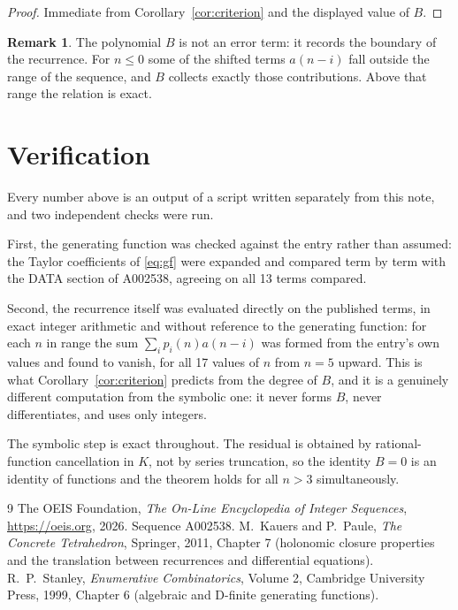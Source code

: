 \documentclass[11pt,a4paper]{article}
\theoremstyle{plain}
\theoremstyle{definition}
\newtheorem{remark}[theorem]{Remark}
\begin{document}
\begin{proof}
Immediate from Corollary~\ref{cor:criterion} and the displayed value of $B$.
\end{proof}

\begin{remark}
The polynomial $B$ is not an error term: it records the boundary of the recurrence. For
$n\le0$ some of the shifted terms $a(n-i)$ fall outside the range of the sequence,
and $B$ collects exactly those contributions. Above that range the relation is exact.
\end{remark}

\section{Verification}

Every number above is an output of a script written separately from this note, and two
independent checks were run.

First, the generating function was checked against the entry rather than assumed: the
Taylor coefficients of \eqref{eq:gf} were expanded and compared term by term with the DATA
section of A002538, agreeing on all 13 terms compared.

Second, the recurrence itself was evaluated directly on the published terms, in exact
integer arithmetic and without reference to the generating function: for each $n$ in range
the sum $\sum_{i}p_{i}(n)a(n-i)$ was formed from the entry's own values and found to
vanish, for all 17 values of $n$ from $n=5$ upward. This is what
Corollary~\ref{cor:criterion} predicts from the degree of $B$, and it is a genuinely
different computation from the symbolic one: it never forms $B$, never differentiates, and
uses only integers.

The symbolic step is exact throughout. The residual is obtained by rational-function
cancellation in $K$, not by series truncation, so the identity $B=0$ is an
identity of functions and the theorem holds for all $n>3$ simultaneously.

\begin{thebibliography}{9}
 The OEIS Foundation, \emph{The On-Line Encyclopedia of Integer Sequences},
\url{https://oeis.org}, 2026. Sequence A002538.
 M.~Kauers and P.~Paule, \emph{The Concrete Tetrahedron}, Springer, 2011,
Chapter 7 (holonomic closure properties and the translation between recurrences and
differential equations).
 R.~P.~Stanley, \emph{Enumerative Combinatorics}, Volume 2, Cambridge
University Press, 1999, Chapter 6 (algebraic and D-finite generating functions).
\end{thebibliography}
\end{document}
